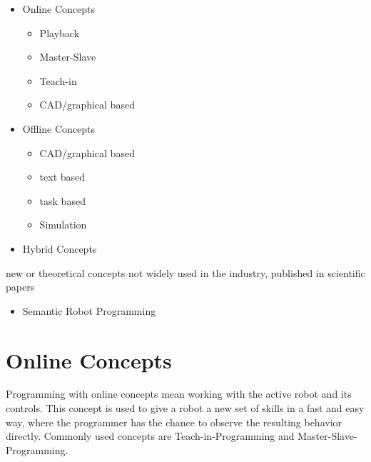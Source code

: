 \documentclass[conference]{IEEEtran}
\begin{document}
 \begin{itemize}
    \item Online Concepts
        \begin{itemize}
            \item Playback
            \item Master-Slave
            \item Teach-in
            \item CAD/graphical based
        \end{itemize}
    \item Offline Concepts
        \begin{itemize}
            \item CAD/graphical based
            \item text based
            \item task based
            \item Simulation
        \end{itemize}
    \item Hybrid Concepts
 \end{itemize}    

new or theoretical concepts
not widely used in the industry, published in scientific papers

\begin{itemize}
    \item Semantic Robot Programming
\end{itemize}

\section{Online Concepts}

Programming with online concepts mean working with the active robot and its controls. %
This concept is used to give a robot a new set of skills in a fast and easy way, where the programmer has the chance to observe the resulting behavior directly. %
Commonly used concepts are Teach-in-Programming and Master-Slave-Programming.

\end{document}
